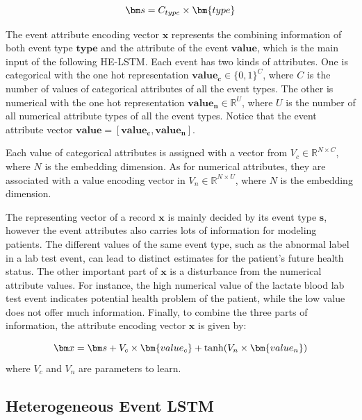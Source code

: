 \documentclass[letterpaper]{article} %
\begin{document}
\begin{equation}
\setlength{\abovedisplayskip}{3pt}
\bm s = C_{type} \times \bm{type}
\setlength{\belowdisplayskip}{3pt}
\end{equation}

The event attribute encoding vector $\bm x$ represents the combining information of both event type $\bm{type}$ and the attribute of the event $\bm{value}$, which is the main input of the following HE-LSTM.
Each event has two kinds of attributes. One is categorical with the one hot representation $\bm{value_c} \in \{0,1\}^{C}$, where $C$ is the number of values of categorical attributes of all the event types. The other is numerical with the one hot representation $\bm{value_n}\in \mathbb{R}^{U}$, where $U$ is the number of all numerical attribute  types of all the event types. Notice that the event attribute vector $\bm{value} =  \left[ \bm{value_c},\bm{value_n} \right]$.

Each value of categorical attributes is assigned with a vector from $V_c \in \mathbb{R}^{N \times C}$, where $N$ is the embedding dimension.
As for numerical attributes, they are associated with a value encoding vector in
$V_n \in \mathbb{R}^{N \times U}$, where $N$ is the embedding dimension.

The representing vector of a record $\bm x$ is mainly decided by its event type $\bm s$, however the event attributes  also carries lots of information for modeling patients.
The different values of the same event type, such as the abnormal label in a lab test event, can lead to distinct estimates for the patient's future health status. The other important part of $\bm x$ is a disturbance from the numerical attribute values. For instance, the high numerical value of the lactate blood lab test event indicates potential health problem of the patient, while the low value does not offer much information.
Finally, to combine the three parts of information, the attribute encoding vector  $\bm x$ is given by:


\begin{equation}
\setlength{\abovedisplayskip}{3pt}
\bm x = \bm s + V_c \times \bm{value_c} + \tanh( V_n \times \bm{value_n})
\setlength{\belowdisplayskip}{3pt}
\end{equation}
where   $V_c$ and $V_n$  are parameters to learn.

\subsection{Heterogeneous Event LSTM}
\end{document}

